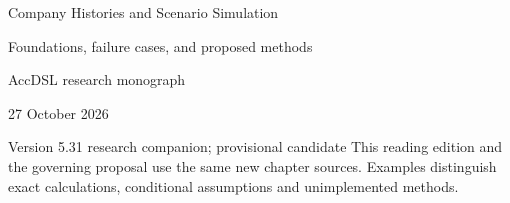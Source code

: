 \documentclass[11pt,a4paper]{report}
\begin{document}
\hypersetup{pageanchor=false}
\begin{titlepage}
{\Huge Company Histories and Scenario Simulation\par}
\vspace{12mm}
{\Large Foundations, failure cases, and proposed methods\par}
\vspace{8mm}
AccDSL research monograph\par 27 October 2026\par Version 5.31 research companion; provisional candidate
\vfill
This reading edition and the governing proposal use the same new chapter sources. Examples distinguish exact calculations, conditional assumptions and unimplemented methods.
\end{titlepage}
\hypersetup{pageanchor=true}
\tableofcontents
\clearpage{}


























\clearpage\label{sim:body-end}

\begingroup\raggedright
\endgroup
\end{document}
